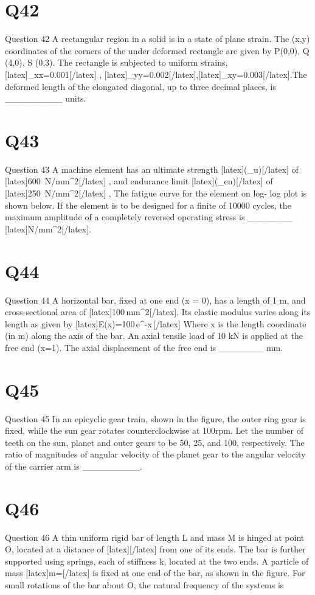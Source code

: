 \section*{Q42}
Question 42 A rectangular region in a solid is in a state of plane strain. The (x,y) coordinates of the corners of the under deformed rectangle are given by P(0,0), Q (4,0), S (0,3). The rectangle is subjected to uniform strains,[latex]\varepsilon \_{xx}=0.001[/latex] , [latex]\varepsilon \_{yy}=0.002[/latex],[latex]\gamma \_{xy}=0.003[/latex].The deformed length of the elongated diagonal, up to three decimal places, is \_\_\_\_\_\_\_\_\_ units.

\section*{Q43}
Question 43 A machine element has an ultimate strength [latex](\sigma \_{u})[/latex] of [latex]600\, N/mm^{2}[/latex] , and endurance limit [latex](\sigma \_{en})[/latex] of  [latex]250\, N/mm^{2}[/latex] , The fatigue curve for the element on log- log plot is shown below. If the element is to be designed for a finite of 10000 cycles, the maximum amplitude of a completely reversed operating stress is \_\_\_\_\_\_\_ [latex]N/mm^{2}[/latex].

\section*{Q44}
Question 44 A horizontal bar, fixed at one end (x = 0), has a length of 1 m, and cross-sectional area of [latex]100\,mm^{2}[/latex].   Its elastic modulus varies along its length as given by [latex]E(x)=100\,e^{-x}\,[/latex]  Where x is the length coordinate 
(in m) along the axis of the bar. An axial tensile load of 10 kN is applied at the free end (x=1). The axial displacement of the free end is \_\_\_\_\_\_\_ mm.

\section*{Q45}
Question 45 In an epicyclic gear train, shown in the figure, the outer ring gear is fixed, while the sun gear rotates counterclockwise at 100rpm. Let the number of teeth on the sun, planet and outer gears to be 50, 25, and 100, respectively. The ratio of magnitudes of angular velocity of the planet gear to the angular velocity of the carrier arm is \_\_\_\_\_\_\_\_\_.

\section*{Q46}
Question 46 A thin uniform rigid bar of length L and mass M is hinged at point O, located at a distance of  [latex][/latex]  from one of its ends. The bar is further supported using springs, each of stiffness k, located at the two ends. A particle of mass [latex]m=[/latex]  is fixed at one end of the bar, as shown in the figure. For small rotations of the bar about O, the natural frequency of the systems is

